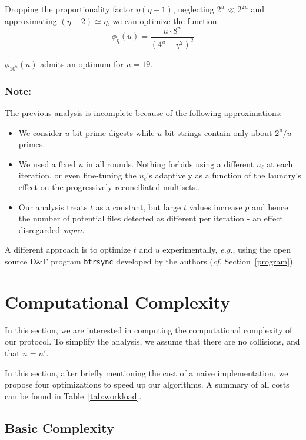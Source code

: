 \documentclass[11pt]{llncs}
\newcommand{\df}{D\&F\xspace}
\newcommand{\btrsync}{\texttt{btrsync}\xspace}
\newcommand{\cf}{\textit{cf.}\xspace}
\newcommand{\eg}{\textit{e.g.}\xspace}
\begin{document}
Dropping the proportionality factor $\eta\left(\eta-1\right)$, neglecting $2^u \ll 2^{2u}$ and approximating $(\eta-2)\simeq\eta$, we can optimize the function:
\nopagebreak
\[
\phi_\eta(u)=\frac{u \cdot 8^u}{\left(4^u-\eta^2\right)^2}
\]

$\phi_{10^6}(u)$ admits an optimum for $u=19$.

\subsubsection{Note:} The previous analysis is incomplete because of the following approximations:
\begin{itemize}
\item We consider $u$-bit prime digests while $u$-bit strings contain only about $2^u/u$ primes.

\item We used a fixed $u$ in all rounds. Nothing forbids using a different $u_\ell$ at each iteration, or even fine-tuning the $u_\ell$'s adaptively as a function of the laundry's effect on the progressively reconciliated multisets..

\item Our analysis treats $t$ as a constant, but large $t$ values increase $p$ and hence the number of potential files detected as different per iteration - an effect disregarded \textit{supra}.
\end{itemize}

A different approach is to optimize $t$ and $u$ experimentally, \eg, using the open source \df program \btrsync developed by the authors (\cf Section~\ref{program}).

\section{Computational Complexity}
\label{comp}
In this section, we are interested in computing the computational complexity of our protocol. 
To simplify the analysis, we assume that there are no collisions, and that $n=n'$.

In this section, after briefly mentioning the cost of a naive implementation, we propose four optimizations to speed up our algorithms.
A summary of all costs can be found in Table~\ref{tab:workload}.

\subsection{Basic Complexity}
\end{document}
